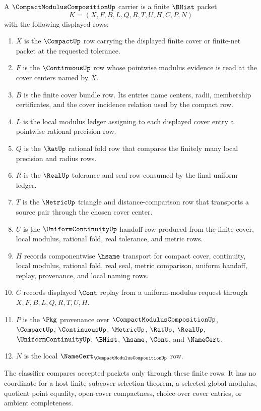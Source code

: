 \begin{definition}
\label{def:compact-modulus-composition-carrier}
A $\CompactModulusCompositionUp$ carrier is a finite $\BHist$ packet
$$
K=(X,F,B,L,Q,R,T,U,H,C,P,N)
$$
with the following displayed rows:
\begin{enumerate}
\item $X$ is the $\CompactUp$ row carrying the displayed finite cover or finite-net packet at the requested tolerance.
\item $F$ is the $\ContinuousUp$ row whose pointwise modulus evidence is read at the cover centers named by $X$.
\item $B$ is the finite cover bundle row. Its entries name centers, radii, membership certificates, and the cover incidence relation used by the compact row.
\item $L$ is the local modulus ledger assigning to each displayed cover entry a pointwise rational precision row.
\item $Q$ is the $\RatUp$ rational fold row that compares the finitely many local precision and radius rows.
\item $R$ is the $\RealUp$ tolerance and seal row consumed by the final uniform ledger.
\item $T$ is the $\MetricUp$ triangle and distance-comparison row that transports a source pair through the chosen cover center.
\item $U$ is the $\UniformContinuityUp$ handoff row produced from the finite cover, local modulus, rational fold, real tolerance, and metric rows.
\item $H$ records componentwise $\hsame$ transport for compact cover, continuity, local modulus, rational fold, real seal, metric comparison, uniform handoff, replay, provenance, and local naming rows.
\item $C$ records displayed $\Cont$ replay from a uniform-modulus request through $X,F,B,L,Q,R,T,U,H$.
\item $P$ is the $\Pkg$ provenance over $\CompactModulusCompositionUp$, $\CompactUp$, $\ContinuousUp$, $\MetricUp$, $\RatUp$, $\RealUp$, $\UniformContinuityUp$, $\BHist$, $\hsame$, $\Cont$, and $\NameCert$.
\item $N$ is the local $\NameCert_{\CompactModulusCompositionUp}$ row.
\end{enumerate}
The classifier compares accepted packets only through these finite rows. It has no coordinate for a host finite-subcover selection theorem, a selected global modulus, quotient point equality, open-cover compactness, choice over cover entries, or ambient completeness.
\end{definition}

